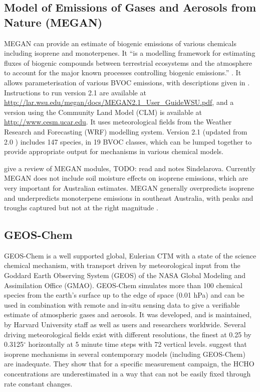   \subsection{Model of Emissions of Gases and Aerosols from Nature (MEGAN)}
    \label{Ch_LitRev:sec:MEGAN}
    MEGAN can provide an estimate of biogenic emissions of various chemicals including isoprene and monoterpenes.
    It ``is a modelling framework for estimating fluxes of biogenic compounds between terrestrial ecosystems and the atmosphere to account for the major known processes controlling biogenic emissions.'' \citep{Guenther2012}.
    It allows parameterisation of various BVOC emissions, with descriptions given in \cite{Guenther2012}.
    Instructions to run version 2.1 are available at \url{http://lar.wsu.edu/megan/docs/MEGAN2.1_User_GuideWSU.pdf}, and a version using the Community Land Model (CLM) is available at \url{http://www.cesm.ucar.edu}.
    It uses meteorological fields from the Weather Research and Forecasting (WRF) modelling system.
    Version 2.1 (updated from 2.0 \citep{Guenther2006}) includes 147 species, in 19 BVOC classes, which can be lumped together to provide appropriate output for mechanisms in various chemical models.

    \cite{Sindelarova2014} give a review of MEGAN modules, TODO: read and notes Sindelarova.
    Currently MEGAN does not include soil moisture effects on isoprene emissions,  which are very important for Australian estimates.
    MEGAN generally overpredicts isoprene and underpredicts monoterpene emissions in southeast Australia, with peaks and troughs captured but not at the right magnitude \citep{Emmerson2016}.
    
    
    
  \subsection{GEOS-Chem}
    \label{Ch_LitRev:sec:GEOSChem}
    GEOS-Chem is a well supported global, Eulerian CTM with a state of the science chemical mechanism, with transport driven by meteorological input from the Goddard Earth Observing System (GEOS) of the NASA Global Modeling and Assimilation Office (GMAO).
    GEOS-Chem simulates more than 100 chemical species from the earth's surface up to the edge of space (0.01 hPa) and can be used in combination with remote and in-situ sensing data to give a verifiable estimate of atmospheric gases and aerosols.
    It was developed, and is maintained, by Harvard University staff as well as users and researchers worldwide. 
    Several driving meteorological fields exist with different resolutions, the finest at 0.25 by 0.3125$^\circ$ horizontally at 5 minute time steps with 72 vertical levels.
    \citet{Marvin2017} suggest that isoprene mechanisms in several contemporary models (including GEOS-Chem) are inadequate. 
    They show that for a specific measurement campaign, the HCHO concentrations are underestimated in a way that can not be easily fixed through rate constant changes.
  
